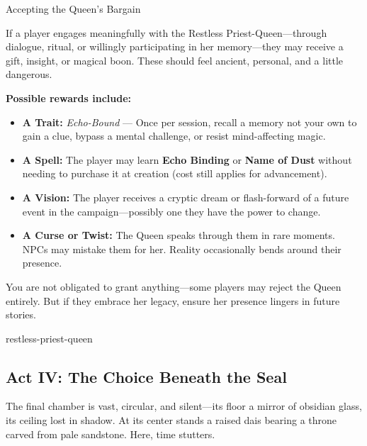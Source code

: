 \begin{CommentBox}{Accepting the Queen’s Bargain}

    If a player engages meaningfully with the Restless Priest-Queen—through dialogue, ritual, or willingly participating in her memory—they may receive a gift, insight, or magical boon. These should feel ancient, personal, and a little dangerous.
    
    \textbf{Possible rewards include:}
    \begin{itemize}
      \item \textbf{A Trait:} \emph{Echo-Bound} — Once per session, recall a memory not your own to gain a clue, bypass a mental challenge, or resist mind-affecting magic.
      
      \item \textbf{A Spell:} The player may learn \textbf{Echo Binding} or \textbf{Name of Dust} without needing to purchase it at creation (cost still applies for advancement).
      
      \item \textbf{A Vision:} The player receives a cryptic dream or flash-forward of a future event in the campaign—possibly one they have the power to change.
      
      \item \textbf{A Curse or Twist:} The Queen speaks through them in rare moments. NPCs may mistake them for her. Reality occasionally bends around their presence.
    \end{itemize}
    
    You are not obligated to grant anything—some players may reject the Queen entirely. But if they embrace her legacy, ensure her presence lingers in future stories.
    
\end{CommentBox}




\newcolumn
{restless-priest-queen}
\newcolumn



\subsection{Act IV: The Choice Beneath the Seal}

The final chamber is vast, circular, and silent—its floor a mirror of obsidian glass, its ceiling lost in shadow. At its center stands a raised dais bearing a throne carved from pale sandstone. Here, time stutters.

